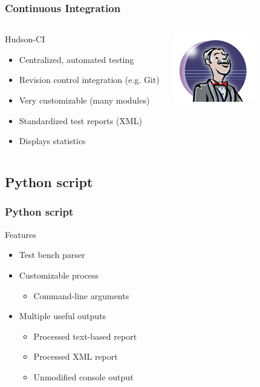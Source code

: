 \documentclass[british,10pt]{beamer}
\begin{document}
\begin{frame}\frametitle{Continuous Integration}
\begin{columns}
\begin{column}{0.6\textwidth}
Hudson-CI
\begin{itemize}
\item Centralized, automated testing
\item Revision control integration (e.g. Git)
\item Very customizable (many modules)
\item Standardized test reports (XML)
\item Displays statistics
\end{itemize}
\end{column}
\includegraphics[width=0.6\textwidth]{images/hudson.png}
\end{columns}
\end{frame}

\subsection{Python script}

\begin{frame}\frametitle{Python script}
Features
\begin{itemize}
\item Test bench parser
\item Customizable process
\begin{itemize}
\item Command-line arguments
\end{itemize}
\item Multiple useful outputs
\begin{itemize}
\item Processed text-based report
\item Processed XML report
\item Unmodified console output
\end{itemize}
\end{itemize}
\end{frame}
\end{document}
